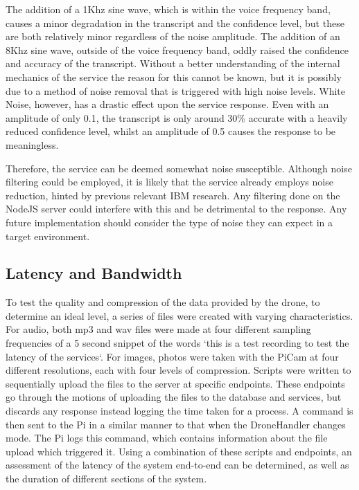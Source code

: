 \documentclass{article}
\begin{document}
The addition of a 1Khz sine wave, which is within the voice frequency band, causes a minor degradation in the transcript and the confidence level, but these are both relatively minor regardless of the noise amplitude. The addition of an 8Khz sine wave, outside of the voice frequency band, oddly raised the confidence and accuracy of the transcript. Without a better understanding of the internal mechanics of the service the reason for this cannot be known, but it is possibly due to a method of noise removal that is triggered with high noise levels. White Noise, however, has a drastic effect upon the service response. Even with an amplitude of only 0.1, the transcript is only around 30\% accurate with a heavily reduced confidence level, whilst an amplitude of 0.5 causes the response to be meaningless. 

Therefore, the service can be deemed somewhat noise susceptible. Although noise filtering could be employed, it is likely that the service already employs noise reduction, hinted by previous relevant IBM research\cite{ibmSpeech}. Any filtering done on the NodeJS server could interfere with this and be detrimental to the response. Any future implementation should consider the type of noise they can expect in a target environment.


\subsection{Latency and Bandwidth}\label{LatencyBandwidth}
To test the quality and compression of the data provided by the drone, to determine an ideal level, a series of files were created with varying characteristics. For audio, both mp3 and wav files were made at four different sampling frequencies of a 5 second snippet of the words `this is a test recording to test the latency of the services`. For images, photos were taken with the PiCam at four different resolutions, each with four levels of compression. Scripts were written to sequentially upload the files to the server at specific endpoints. These endpoints go through the motions of uploading the files to the database and services, but discards any response instead logging the time taken for a process. A command is then sent to the Pi in a similar manner to that when the DroneHandler changes mode. The Pi logs this command, which contains information about the file upload which triggered it. Using a combination of these scripts and endpoints, an assessment of the latency of the system end-to-end can be determined, as well as the duration of different sections of the system. 
\end{document}
